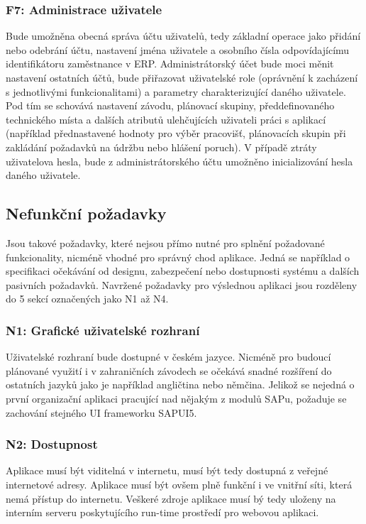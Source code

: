 \documentclass[thesis=M,czech]{FITthesis}[2012/06/26]
\begin{document}
\subsubsection{F7: Administrace uživatele}
\label{sssec:fc_administrace}
Bude umožněna obecná správa účtu uživatelů, tedy základní operace jako přidání nebo odebrání účtu, nastavení jména uživatele a osobního čísla odpovídajícímu identifikátoru zaměstnance v ERP. Administrátorský účet bude moci měnit nastavení ostatních účtů, bude přiřazovat uživatelské role (oprávnění k zacházení s jednotlivými funkcionalitami) a parametry charakterizující daného uživatele. Pod tím se schovává nastavení závodu, plánovací skupiny, předdefinovaného technického místa a dalších atributů ulehčujících uživateli práci s aplikací (například přednastavené hodnoty pro výběr pracovišť, plánovacích skupin při zakládání požadavků na údržbu nebo hlášení poruch). V případě ztráty uživatelova hesla, bude z administrátorského účtu umožněno inicializování hesla daného uživatele.

\subsection{Nefunkční požadavky}
Jsou takové požadavky, které nejsou přímo nutné pro splnění požadované funkcionality, nicméně vhodné pro správný chod aplikace. Jedná se například o specifikaci očekávání od designu, zabezpečení nebo dostupnosti systému a dalších pasivních požadavků. Navržené požadavky pro výslednou aplikaci jsou rozděleny do 5 sekcí označených jako N1 až N4.
\subsubsection{N1: Grafické uživatelské rozhraní}
Uživatelské rozhraní bude dostupné v českém jazyce. Nicméně pro budoucí plánované využití i v zahraničních závodech se očekává snadné rozšíření do ostatních jazyků jako je například angličtina nebo němčina. Jelikož se nejedná o první organizační aplikaci pracující nad nějakým z modulů SAPu, požaduje se zachování stejného UI frameworku SAPUI5.
\subsubsection{N2: Dostupnost}
Aplikace musí být viditelná v internetu, musí být tedy dostupná z veřejné internetové adresy. Aplikace musí být ovšem plně funkční i ve vnitřní síti, která nemá přístup do internetu. Veškeré zdroje aplikace musí bý tedy uloženy na interním serveru poskytujícího run-time prostředí pro webovou aplikaci.
\end{document}

